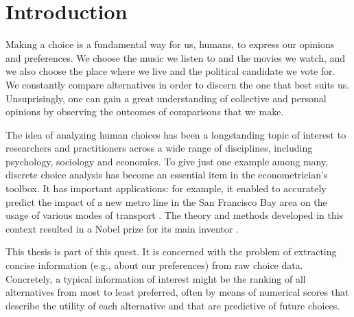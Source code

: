 \chapter{Introduction}
\label{ch:intro}

Making a choice is a fundamental way for us, humans, to express our opinions and preferences.
We choose the music we listen to and the movies we watch, and we also choose the place where we live and the political candidate we vote for.
We constantly compare alternatives in order to discern the one that best suits us.
Unsuprisingly, one can gain a great understanding of collective and personal opinions by observing the outcomes of comparisons that we make.

The idea of analyzing human choices has been a longstanding topic of interest to researchers and practitioners across a wide range of disciplines, including psychology, sociology and economics.
To give just one example among many, discrete choice analysis has become an essential item in the econometrician's toolbox.
It has important applications: for example, it enabled to accurately predict the impact of a new metro line in the San Francisco Bay area on the usage of various modes of transport \citep{mcfadden1977demand}.
The theory and methods developed in this context resulted in a Nobel prize for its main inventor \citep{mcfadden2001economic}.

This thesis is part of this quest.
It is concerned with the problem of extracting concise information (e.g., about our preferences) from raw choice data.
Concretely, a typical information of interest might be the ranking of all alternatives from most to least preferred, often by means of numerical scores that describe the utility of each alternative and that are predictive of future choices.

